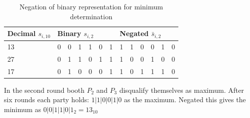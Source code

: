 		\begin{table}[!htb]
			\centering
			\caption{Negation of binary representation for minimum determination} \label{table:secure minimum negation}
			\begin{tabular}{|l|l|l|l|l|l|l|l|l|l|l|l|l|}
				\hline
				Decimal $s_{i,10}$ & \multicolumn{6}{l|}{Binary $s_{i,2}$}  & \multicolumn{6}{l|}{Negated $\bar{s}_{i,2}$} \\ \hline
				13                 & 0    & 0    & 1    & 1    & 0   & 1 & 1    & 1    & 0    & 0    & 1   & 0   \\ \hline
				27                 & 0    & 1    & 1    & 0    & 1   & 1 & 1    & 0    & 0    & 1    & 0   & 0   \\ \hline
				17                 & 0    & 1    & 0    & 0    & 0   & 1 & 1    & 0    & 1    & 1    & 1   & 0   \\ \hline
			\end{tabular}
		\end{table}
	
		In the second round booth $P_2$ and $P_3$ disqualify themselves as maximum. After six rounds each party holds: $1|1|0|0|1|0$ as the maximum. Negated this gives the minimum as $0|0|1|1|0|1_2=13_{10}$ 

		\FloatBarrier
		
